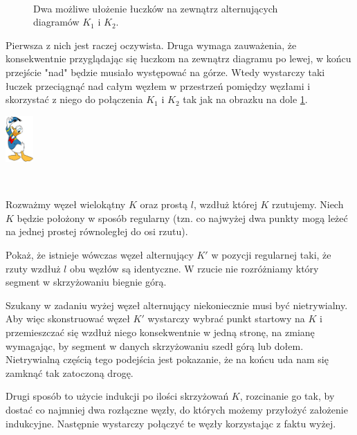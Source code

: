 \documentclass{article}
\renewenvironment{proof}{{\bfseries\color{orange} Dowód}$ $\newline}{
  \begin{flushright}\includegraphics[width=30pt]{Donald_Duck.png}\end{flushright}$ $\newline
}
\begin{document}
\begin{proof}
\begin{figure}[h]
    \caption{\label{fakt 1 dowodzik}Dwa możliwe ułożenie łuczków na zewnątrz alternujących diagramów $K_1$ i $K_2$.}
  \end{figure}
  
  Pierwsza z nich jest raczej oczywista. Druga wymaga zauważenia, że konsekwentnie przyglądając się łuczkom na zewnątrz diagramu po lewej, w końcu przejście "nad" będzie musiało występować na górze. Wtedy wystarczy taki łuczek przeciągnąć nad całym węzłem w przestrzeń pomiędzy węzłami i skorzystać z niego do połączenia $K_1$ i $K_2$ tak jak na obrazku na dole \cref{fakt 1 dowodzik}. 
\end{proof}

\begin{problem}
  Rozważmy węzeł wielokątny $K$ oraz prostą $l$, wzdłuż której $K$ rzutujemy. Niech $K$ będzie położony w sposób regularny (tzn. co najwyżej dwa punkty mogą leżeć na jednej prostej równoległej do osi rzutu). 

  Pokaż, że istnieje wówczas węzeł alternujący $K'$ w pozycji regularnej taki, że rzuty wzdłuż $l$ obu węzłów są identyczne. W rzucie nie rozróżniamy który segment w skrzyżowaniu biegnie górą.
  
\end{problem}
{\color{red}
  Szukany w zadaniu wyżej węzeł alternujący niekoniecznie musi być nietrywialny. Aby więc skonstruować węzeł $K'$ wystarczy wybrać punkt startowy na $K$ i przemieszczać się wzdłuż niego konsekwentnie w jedną stronę, na zmianę wymagając, by segment w danych skrzyżowaniu szedł górą lub dołem. Nietrywialną częścią tego podejścia jest pokazanie, że na końcu uda nam się zamknąć tak zatoczoną drogę.

Drugi sposób to użycie indukcji po ilości skrzyżowań $K$, rozcinanie go tak, by dostać co najmniej dwa rozłączne węzły, do których możemy przyłożyć założenie indukcyjne. Następnie wystarczy połączyć te węzły korzystając z faktu wyżej.
}
\end{document}
